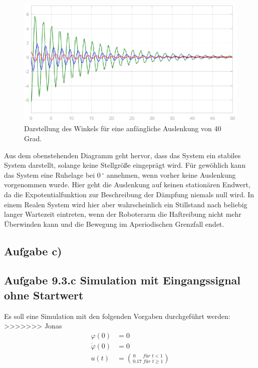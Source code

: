 \documentclass[10pt]{scrartcl}
\begin{document}
\begin{figure}[H]
	\centering
	\includegraphics[width=1\textwidth]{9b}
	\caption{Darstellung des Winkels für eine anfängliche Auslenkung von 40 Grad. }
	\label{img:grafik-dummy}
\end{figure}

Aus dem obenstehenden Diagramm geht hervor, dass das System ein stabiles System darstellt, solange keine Stellgröße eingeprägt wird. Für gewöhlich kann das System eine Ruhelage bei 0\,$^\circ$ annehmen, wenn vorher keine Auslenkung vorgenommen wurde. Hier geht die Auslenkung auf keinen stationären Endwert, da die Expotentialfunktion zur Beschreibung der Dämpfung niemals null wird. In einem Realen System wird hier aber wahrscheinlich ein Stillstand nach beliebig langer Wartezeit eintreten, wenn der Roboterarm die Haftreibung nicht mehr Überwinden kann und die Bewegung im Aperiodischen Grenzfall endet.
\newpage
\subsection{Aufgabe c)}




\subsection{Aufgabe 9.3.c  Simulation mit Eingangssignal ohne Startwert}
Es soll eine Simulation mit den folgenden Vorgaben durchgeführt werden: 
>>>>>>> Jonas
\begin{align}
\varphi  (0) &= 0 \\
\dot \varphi (0) &= 0 \\
u(t)  &= \binom{0\,\,\,\,\,\,\,\,\, für\,\, t<1}{0.17\,\, für\,\, t \geq 1}
\end{align}
%
\end{document}
